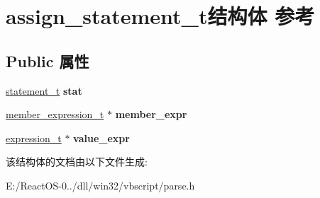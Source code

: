\hypertarget{structassign__statement__t}{}\section{assign\+\_\+statement\+\_\+t结构体 参考}
\label{structassign__statement__t}
\subsection*{Public 属性}
\begin{DoxyCompactItemize}
\item 
\mbox{\label{structassign__statement__t_af6c66b0f15e42d12b595e4f97a6d6555}} 
\hyperlink{struct__statement__t}{statement\+\_\+t} {\bfseries stat}
\item 
\mbox{\label{structassign__statement__t_a4cdd8e14187e5bfea4112486f647c793}} 
\hyperlink{structmember__expression__t}{member\+\_\+expression\+\_\+t} $\ast$ {\bfseries member\+\_\+expr}
\item 
\mbox{\label{structassign__statement__t_a0f2a1e1be4a98d8b62a13e9a367a9506}} 
\hyperlink{struct__expression__t}{expression\+\_\+t} $\ast$ {\bfseries value\+\_\+expr}
\end{DoxyCompactItemize}


该结构体的文档由以下文件生成\+:\begin{DoxyCompactItemize}
\item 
E\+:/\+React\+O\+S-\/0../dll/win32/vbscript/parse.\+h\end{DoxyCompactItemize}
